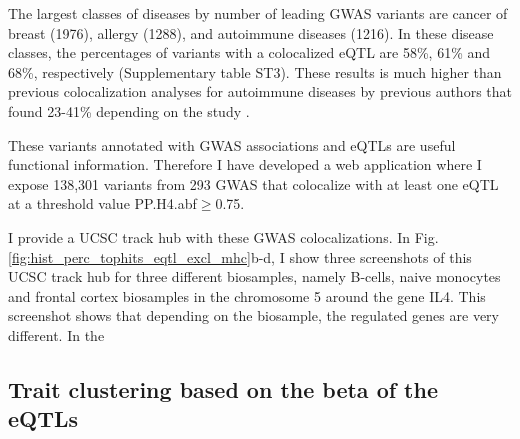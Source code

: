 The largest classes of diseases by number of leading GWAS variants are cancer of breast (1976), allergy (1288), and autoimmune diseases (1216).
%
In these disease classes, the percentages of variants with a colocalized eQTL are 58\%, 61\% and 68\%, respectively (Supplementary table ST3).
%
These results is much higher than previous colocalization analyses for autoimmune diseases by previous authors that
found 23-41\% depending on the study \cite{2016.Soranzo.Chen,2017.Cotsapas.Chun,2021.Li.Mu}.

These variants annotated with GWAS associations and eQTLs are useful functional information.
%
Therefore I have developed a web application where I expose 138,301 variants from 293 GWAS that colocalize with at least
one eQTL at a threshold value PP.H4.abf$\geq$0.75.

I provide a UCSC track hub with these GWAS colocalizations.
%
In Fig. \ref{fig:hist_perc_tophits_eqtl_excl_mhc}b-d, I show three screenshots of this UCSC track hub for three different biosamples, namely B-cells, naive monocytes and frontal cortex biosamples in the chromosome 5 around the gene IL4.
%
This screenshot shows that depending on the biosample, the regulated genes are very different.
%
In the

%
\subsection*{Trait clustering based on the beta of the eQTLs}
%

